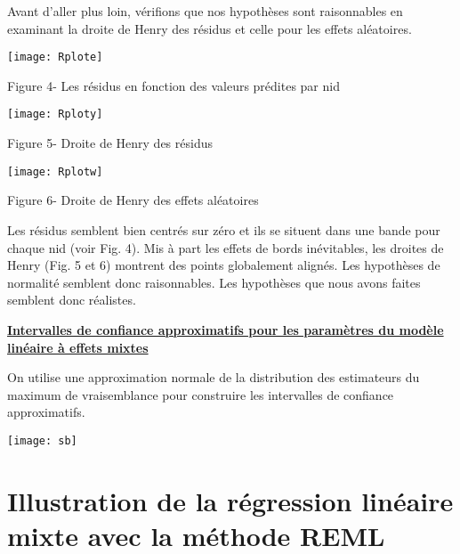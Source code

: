 \documentclass[12pt,fleqn]{book} %
\begin{document}
Avant d'aller plus loin, vérifions que nos hypothèses sont raisonnables en examinant la droite de Henry des résidus et celle pour les effets aléatoires.


\newpage

\texttt{[image: Rplote]}
\begin{center} Figure 4-  Les résidus en fonction des valeurs prédites par nid  \end{center}

\vspace{2em}

\texttt{[image: Rploty]}
\begin{center} Figure 5- Droite de Henry des résidus    \end{center}

\texttt{[image: Rplotw]}
\begin{center} Figure 6- Droite de Henry des effets aléatoires  \end{center}

\vspace{2em}

Les résidus semblent bien centrés sur zéro et ils se situent dans une bande pour chaque nid (voir Fig. 4).
Mis à part les effets de bords inévitables, les droites de Henry (Fig. 5 et 6) montrent des points globalement alignés. Les hypothèses de normalité semblent donc raisonnables. Les hypothèses que nous avons faites semblent donc réalistes.

\newpage

\underline{\textbf{Intervalles de confiance approximatifs pour les paramètres du modèle linéaire à effets mixtes}}

\vspace{0.5em}

On utilise une approximation normale de la distribution des estimateurs du maximum de vraisemblance pour construire les intervalles de confiance approximatifs.

\vspace{2em}


\vspace{2em}

\texttt{[image: sb]}


\newpage

\section{Illustration de la régression linéaire mixte avec la méthode REML }
\end{document}
